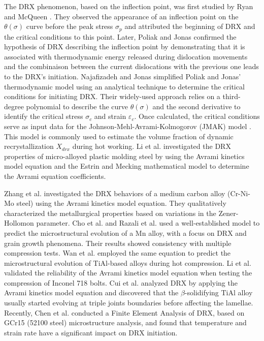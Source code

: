 \documentclass[metals,article,submit,pdftex,moreauthors]{Definitions/mdpi}
\makeatletter
\DeclareRobustCommand{\eal}{et al.\@\xspace}
\makeatother
\begin{document}
The DRX phenomenon, based on the inflection point, was first studied by Ryan and McQueen \cite{ryan1989dynamic, ryan1990dynamic, ryan1990flow}.
They observed the appearance of an inflection point on the $\theta(\sigma)$ curve before the peak stress $\sigma_p$ and attributed the beginning of DRX and the critical conditions to this point.
Later, Poliak and Jonas \cite{Poliak-1996,Poliak-2003,Poliak-2003-2,jonas2003critical} confirmed the hypothesis of DRX describing the inflection point by demonstrating that it is associated with thermodynamic energy released during dislocation movements and the combinaison between the current dislocations with the previous one leads to the DRX's initiation.
Najafizadeh and Jonas \cite{Najafizadeh-2006} simplified Poliak and Jonas' thermodynamic model using an analytical technique to determine the critical conditions for initiating DRX.
Their widely-used approach relies on a third-degree polynomial to describe the curve $\theta(\sigma)$ and the second derivative to identify the critical stress $\sigma_c$ and strain $\varepsilon_c$.
Once calculated, the critical conditions serve as input data for the Johnson-Mehl-Avrami-Kolmogorov (JMAK) model \cite{Avrami-1939}.
This model is commonly used to estimate the volume fraction of dynamic recrystallization $X_{drx}$ during hot working.
Li \eal \cite{li2015experimental} investigated the DRX properties of micro-alloyed plastic molding steel by using the Avrami kinetics model equation and the Estrin and Mecking mathematical model \cite{estrin1984unified,mecking1981kinetics} to determine the Avrami equation coefficients.

Zhang \eal \cite{zhang2016kinetics} investigated the DRX behaviors of a medium carbon alloy (Cr-Ni-Mo steel) using the Avrami kinetics model equation.
They qualitatively characterized the metallurgical properties based on variations in the Zener-Hollomon parameter.
Cho \eal \cite{cho2005prediction} and Razali \eal \cite{razali2021new} used a well-established model to predict the microstructural evolution of a Mn alloy, with a focus on DRX and grain growth phenomena.
Their results showed consistency with multiple compression tests.
Wan \eal \cite{wan2017experimental} employed the same equation to predict the microstructural evolution of TiAl-based alloys during hot compression.
Li \eal \cite{li2018finite} validated the reliability of the Avrami kinetics model equation when testing the compression of Inconel 718 bolts.
Cui \eal \cite{cui2016hot} analyzed DRX by applying the Avrami kinetics model equation and discovered that the $\beta$-solidifying TiAl alloy usually started evolving at triple joints boundaries before affecting the lamellae.
Recently, Chen \eal \cite{chen2023finite} conducted a Finite Element Analysis of DRX, based on GCr15 (52100 steel) microstructure analysis, and found that temperature and strain rate have a significant impact on DRX initiation.
\end{document}
